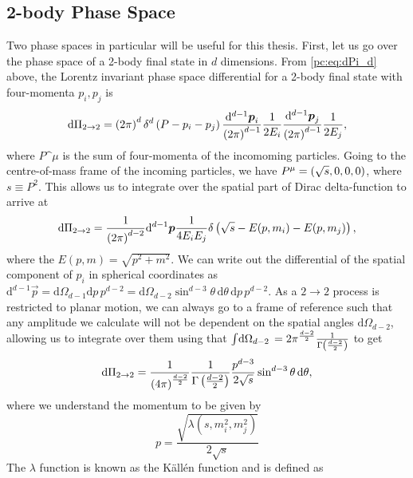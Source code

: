 \documentclass[../main.tex]{subfiles}
\begin{document}
\subsection{2-body Phase Space}
Two phase spaces in particular will be useful for this thesis.
First, let us go over the phase space of a 2-body final state in \(d\) dimensions.
From \cref{pc:eq:dPi_d} above, the Lorentz invariant phase space differential for a 2-body final state with
four-momenta \(p_i, p_j\) is
\begin{equation}
  \mathrm{d}\Pi_{2\to 2} = \left(2\pi\right)^d \delta^d\left(P - p_i -
    p_j\right) \frac{\mathrm{d}^{d-1} \boldsymbol{p}_i}{\left(2\pi\right)^{d-1}}
  \frac{1}{2E_i}
  \frac{\mathrm{d}^{d-1} \boldsymbol{p}_j}{\left(2\pi\right)^{d-1}} \frac{1}{2E_j},
\end{equation}
where \(P\^\mu\) is the sum of four-momenta of the incomoming particles.
Going to the centre-of-mass frame of the incoming particles, we have \(P\^\mu =
\pclosed{\sqrt{s}, 0, 0, 0}\), where \(s \equiv P^2\).
This allows us to integrate over the spatial part of Dirac delta-function to arrive at
\begin{equation}
  \mathrm{d}\Pi_{2\to 2} = \frac{1}{\left(2\pi\right)^{d-2}}
  \mathrm{d}^{d-1} \boldsymbol{p} \frac{1}{4E_i E_j} \delta\left(\sqrt{s} -
    E(p, m_i)
    - E(p, m_j)\right),
\end{equation}
where the \(E(p, m) = \sqrt{p^2 + m^2}\).
We can write out the differential of the spatial component of \(p_i\) in
spherical coordinates as \(\mathrm{d}^{d-1} \vec{p} = \mathrm{d}\Omega_{d-1}
\mathrm{d}p \, p^{d-2} = \mathrm{d}\Omega_{d-2} \sin^{d-3}\theta \,
\mathrm{d}\theta \, \mathrm{d}p \, p^{d-2}\).
As a \(2\to 2\) process is restricted to planar motion, we can always go to a
frame of reference such that any amplitude we calculate will not be dependent
on the spatial angles \(\mathrm{d} \Omega_{d-2}\), allowing us to integrate
over them using that \(\int \!\mathrm{d}\Omega_{d-2}\, = 2 \pi^{\frac{d-2}{2}}
\frac{1}{\Gamma\left(\frac{d-2}{2}\right)}\) to get
\begin{equation}
  \label{pc:eq:dPi_dtheta}
  \mathrm{d}\Pi_{2\to 2} = \frac{1}{\left(4\pi\right)^{\frac{d-2}{2}}}
  \frac{1}{\Gamma\left(\frac{d-2}{2}\right)} \frac{p^{d-3}}{2 \sqrt{s}}
  \sin^{d-3}\theta \,\mathrm{d}\theta,
\end{equation}
where we understand the momentum to be given by
\begin{equation}
  \label{pc:eq:p}
  p = \frac{\sqrt{\lambda(s, m_i^2, m_j^2)}}{2\sqrt{s}}
\end{equation}
The \(\lambda\) function is known as the Källén function and is defined as
\end{document}
